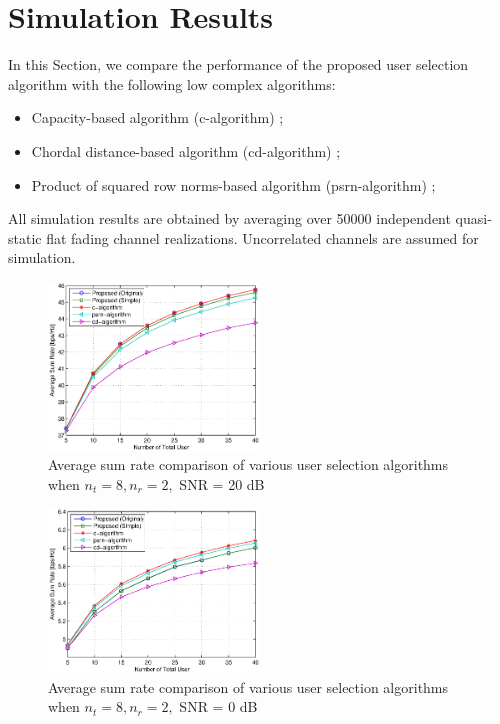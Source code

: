 \documentclass[journal,twoside]{IEEEtranTCOM}
\begin{document}
\section{Simulation Results} \label{Section:Simulation Results}
In this Section, we compare the performance of the proposed user selection algorithm with the following low complex algorithms:
\begin{itemize}
\item{Capacity-based algorithm (c-algorithm) \cite{c_n};}
\item{Chordal distance-based algorithm (cd-algorithm) \cite{CD_conf};}
\item{Product of squared row norms-based algorithm (psrn-algorithm) \cite{SRN};}
\end{itemize}
All simulation results are obtained by averaging over 50000 independent quasi-static flat fading channel realizations. Uncorrelated channels are assumed for simulation.

\begin{figure}[!tb]
    \centering
    \includegraphics[width=0.50\textwidth]{SNR20dB.eps}
\caption{Average sum rate comparison of various user selection algorithms when $n_t=8, n_r=2,$ SNR = 20 dB}  \label{Figure:SumRate1}
\end{figure}

\begin{figure}[!tb]
    \centering
    \includegraphics[width=0.50\textwidth]{SNR0dB.eps}
\caption{Average sum rate comparison of various user selection algorithms when $n_t=8, n_r=2,$ SNR = 0 dB}  \label{Figure:SumRate2}
\end{figure}
\end{document}
